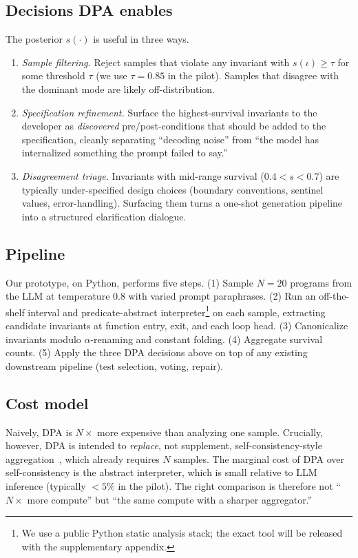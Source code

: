 \documentclass[sigconf,review,anonymous,nonacm]{acmart}
\begin{document}
\subsection{Decisions DPA enables}
The posterior $s(\cdot)$ is useful in three ways.
\begin{enumerate}
\item \emph{Sample filtering.} Reject samples that violate any invariant
with $s(\iota) \geq \tau$ for some threshold $\tau$ (we use
$\tau = 0.85$ in the pilot). Samples that disagree with the dominant
mode are likely off-distribution.
\item \emph{Specification refinement.} Surface the highest-survival
invariants to the developer as \emph{discovered} pre/post-conditions
that should be added to the specification, cleanly separating
``decoding noise'' from ``the model has internalized something the
prompt failed to say.''
\item \emph{Disagreement triage.} Invariants with mid-range survival
($0.4 < s < 0.7$) are typically under-specified design choices
(boundary conventions, sentinel values, error-handling). Surfacing them
turns a one-shot generation pipeline into a structured
clarification dialogue.
\end{enumerate}

\subsection{Pipeline}
Our prototype, on Python, performs five steps. (1) Sample $N=20$
programs from the LLM at temperature 0.8 with varied prompt
paraphrases. (2) Run an off-the-shelf interval and predicate-abstract
interpreter\footnote{We use a public Python static analysis stack; the
exact tool will be released with the supplementary appendix.} on each
sample, extracting candidate invariants at function entry, exit, and
each loop head. (3) Canonicalize invariants modulo $\alpha$-renaming
and constant folding. (4) Aggregate survival counts. (5) Apply the three
DPA decisions above on top of any existing downstream pipeline (test
selection, voting, repair).

\subsection{Cost model}
Naively, DPA is $N\times$ more expensive than analyzing one sample.
Crucially, however, DPA is intended to \emph{replace}, not supplement,
self-consistency-style aggregation~\cite{wang2023selfconsistency}, which
already requires $N$ samples. The marginal cost of DPA over
self-consistency is the abstract interpreter, which is small relative
to LLM inference (typically $<5\%$ in the pilot). The right
comparison is therefore not ``$N\times$ more compute'' but ``the same
compute with a sharper aggregator.''
\end{document}
